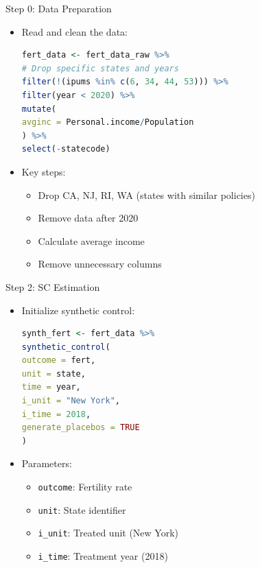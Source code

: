 \documentclass[hyperref={pdfpagelabels=false}]{beamer}
\begin{document}
\begin{frame}[fragile]{Step 0: Data Preparation}
\begin{itemize}
\item Read and clean the data:
\vspace{0.2cm}
\begin{lstlisting}[language=R, style=r-style]
fert_data <- fert_data_raw %>%
# Drop specific states and years
filter(!(ipums %in% c(6, 34, 44, 53))) %>%  
filter(year < 2020) %>%
mutate(
avginc = Personal.income/Population
) %>%
select(-statecode)
\end{lstlisting}
\vspace{0.2cm}
\item Key steps:
\begin{itemize}
	\item Drop CA, NJ, RI, WA (states with similar policies)
	\item Remove data after 2020
	\item Calculate average income
	\item Remove unnecessary columns
\end{itemize}
\end{itemize}
\end{frame}

\begin{frame}[fragile]{Step 2: SC Estimation}
\begin{itemize}
\item Initialize synthetic control:
\vspace{0.2cm}
\begin{lstlisting}[language=R, style=r-style]
synth_fert <- fert_data %>%
synthetic_control(
outcome = fert,
unit = state,
time = year,
i_unit = "New York",
i_time = 2018,
generate_placebos = TRUE
)
\end{lstlisting}
\vspace{0.2cm}
\item Parameters:
\begin{itemize}
\item \texttt{outcome}: Fertility rate
\item \texttt{unit}: State identifier
\item \texttt{i\_unit}: Treated unit (New York)
\item \texttt{i\_time}: Treatment year (2018)
\end{itemize}
\end{itemize}
\end{frame}
\end{document}
